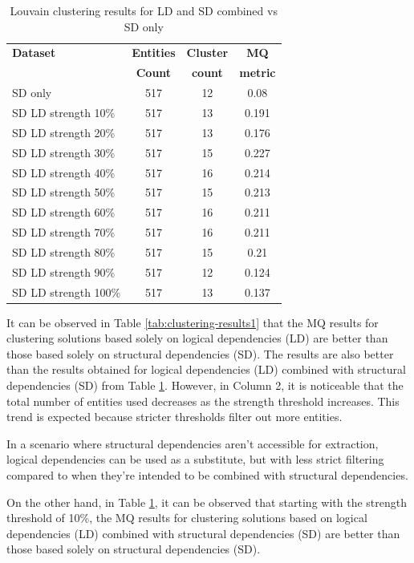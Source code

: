 \documentclass[conference]{IEEEtran}
\begin{document}
\begin{table}[htbp]
  \centering
  \caption{Louvain clustering results for LD and SD combined vs SD only}
  \label{tab:clustering-results2}
  \begin{tabular}{lc|c|c}
    \toprule
    \textbf{Dataset} & \textbf{Entities} & \textbf{Cluster} & \textbf{MQ } \\
    & \textbf{Count} & \textbf{count} &  \textbf{metric} \\
    \midrule
    SD only & 517 & 12 & 0.08 \\
    \midrule
    SD LD strength 10\% & 517 & 13 & 0.191 \\
    SD LD strength 20\% & 517 & 13 & 0.176 \\
    SD LD strength 30\% & 517 & 15 & 0.227 \\
    SD LD strength 40\% & 517 & 16 & 0.214 \\
    SD LD strength 50\% & 517 & 15 & 0.213 \\
    SD LD strength 60\% & 517 & 16 & 0.211 \\
    SD LD strength 70\% & 517 & 16 & 0.211 \\
    SD LD strength 80\% & 517 & 15 & 0.21 \\
    SD LD strength 90\% & 517 & 12 & 0.124 \\
    SD LD strength 100\% & 517 & 13 & 0.137 \\
    \bottomrule
  \end{tabular}
\end{table}

It can be observed in Table \ref{tab:clustering-results1} that the MQ results for clustering solutions based solely on logical dependencies (LD) are better than those based solely on structural dependencies (SD). The results are also better than the results obtained for logical dependencies (LD) combined with structural dependencies (SD) from Table \ref{tab:clustering-results2}. However, in Column 2, it is noticeable that the total number of entities used decreases as the strength threshold increases. This trend is expected because stricter thresholds filter out more entities.

In a scenario where structural dependencies aren't accessible for extraction, logical dependencies can be used as a substitute, but with less strict filtering compared to when they're intended to be combined with structural dependencies.

On the other hand, in Table \ref{tab:clustering-results2}, it can be observed that starting with the strength threshold of 10\%, the MQ results for clustering solutions based on logical dependencies (LD) combined with structural dependencies (SD) are better than those based solely on structural dependencies (SD).
\end{document}
